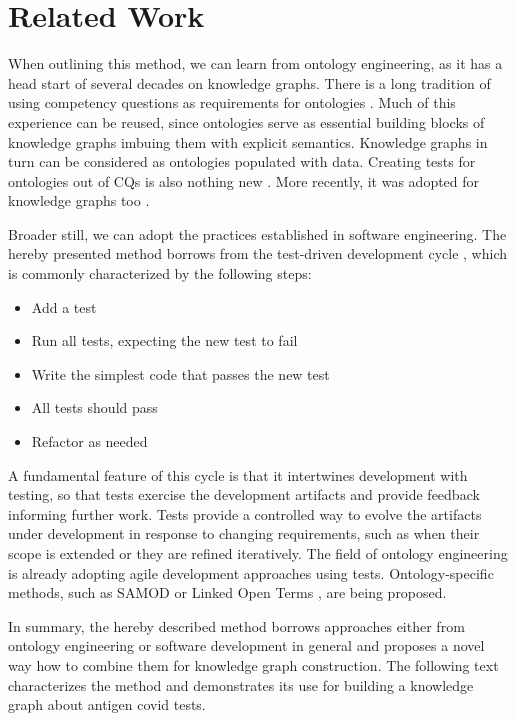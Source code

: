 \documentclass[
]{ceurart}
\begin{document}
\section{Related Work}
When outlining this method, we can learn from ontology engineering, as it has a head start of several decades on knowledge graphs. There is a long tradition of using competency questions as requirements for ontologies \cite{Gruninger1994}. Much of this experience can be reused, since ontologies serve as essential building blocks of knowledge graphs imbuing them with explicit semantics. Knowledge graphs in turn can be considered as ontologies populated with data. Creating tests for ontologies out of CQs is also nothing new \cite{Ren2014,Zemmouchi2013}. More recently, it was adopted for knowledge graphs too \cite{Pan2017}.

Broader still, we can adopt the practices established in software engineering. The hereby presented method borrows from the test-driven development cycle \cite{Beck2003}, which is commonly characterized by the following steps:
\begin{itemize}
    \item Add a test
    \item Run all tests, expecting the new test to fail
    \item Write the simplest code that passes the new test
    \item All tests should pass
    \item Refactor as needed
\end{itemize}

A fundamental feature of this cycle is that it intertwines development with testing, so that tests exercise the development artifacts and provide feedback informing further work. Tests provide a controlled way to evolve the artifacts under development in response to changing requirements, such as when their scope is extended or they are refined iteratively. The field of ontology engineering is already adopting agile development approaches using tests. Ontology-specific methods, such as SAMOD \cite{Peroni2016} or Linked Open Terms \cite{PovedaVillalon2022}, are being proposed.

In summary, the hereby described method borrows approaches either from ontology engineering or software development in general and proposes a novel way how to combine them for knowledge graph construction. The following text characterizes the method and demonstrates its use for building a knowledge graph about antigen covid tests.
\end{document}
